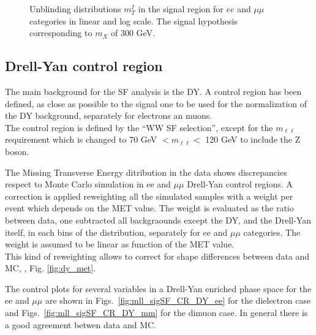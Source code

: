 \begin{figure}[htbp]
{}
\caption{Unblinding distributions  $m_T^I$ in the signal region for $ee$ and $\mu \mu$ categories in linear and log scale. The signal hypothesis corresponding to $m_X $ of 300 GeV.}
    \label{fig:mti_sigOF_Un}
\end{figure}




\newpage


\subsection{Drell-Yan control region}
The main background for the SF analysis is the DY. 
A control region has been defined, as close as possible to the signal one to
be used for the normalization of the DY background, separately for electrons
an muons.\\
The control region is defined by the ``WW SF selection'', except for the
$m_{\ell \ell}$ requirement which is changed to 70 GeV $ <m_{\ell \ell} <$ 120
GeV to include the Z boson.

The Missing Transverse Energy ditribution in the data shows discrepancies respect to Monte Carlo simulation  in ee and $\mu \mu$ Drell-Yan control regions. A correction is applied reweighting all the simulated samples with a weight per event which depends on the MET value. 
The weight is evaluated as the ratio between data, one subtracted all backgraounds except the DY, and the Drell-Yan itself, in each bins of the distribution, separately for ee and $\mu \mu$ categories. The weight is assumed to be linear as function of the MET value.\\
This kind of reweighting allows to correct for shape differences between data and MC, , Fig. \ref{fig:dy_met}.


The control plots for several variables in a Drell-Yan enriched phase space
for the ee and $\mu \mu$ are shown in Figs.~\ref{fig:mll_sigSF_CR_DY_ee} for
the dielectron case and Figs.~\ref{fig:mll_sigSF_CR_DY_mm} for the dimuon
case. In general there is a good agreement betwen data and MC.


